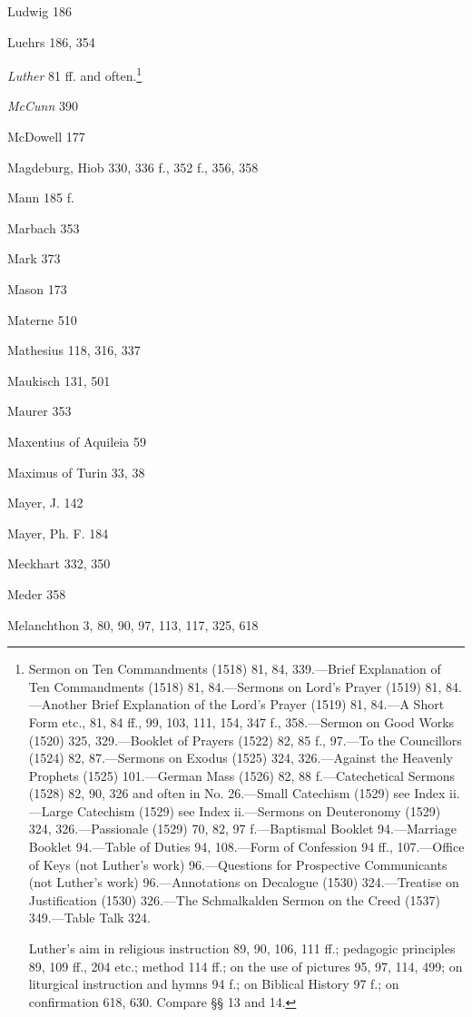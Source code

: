 Ludwig 186

Luehrs 186, 354

\emph{Luther} 81 ff. and often.\footnote{Sermon on Ten Commandments (1518) 81, 84, 339.—Brief Explanation of Ten Commandments (1518) 81, 84.—Sermons on Lord’s Prayer (1519) 81, 84.—Another Brief Explanation of the Lord’s Prayer (1519) 81, 84.—A Short Form
etc., 81, 84 ff., 99, 103, 111, 154, 347 f., 358.—Sermon on Good Works (1520) 325, 329.—Booklet of Prayers (1522) 82, 85 f., 97.—To the Councillors (1524) 82, 87.—Sermons on Exodus (1525) 324, 326.—Against the Heavenly Prophets (1525) 101.—German Mass (1526) 82, 88 f.—Catechetical Sermons (1528) 82, 90, 326 and often in No. 26.—Small Catechism (1529) see Index ii.—Large Catechism (1529) see Index ii.—Sermons on Deuteronomy (1529) 324, 326.—Passionale (1529) 70, 82, 97 f.—Baptismal Booklet 94.—Marriage Booklet 94.—Table of Duties 94, 108.—Form of Confession 94 ff., 107.—Office of Keys (not Luther’s work) 96.—Questions for Prospective Communicants (not Luther’s work) 96.—Annotations on Decalogue (1530) 324.—Treatise on Justification (1530) 326.—The Schmalkalden Sermon on the Creed (1537) 349.—Table Talk 324.

Luther’s aim in religious instruction 89, 90, 106, 111 ff.; pedagogic principles 89, 109 ff., 204 etc.; method 114 ff.; on the use of pictures 95, 97, 114, 499; on liturgical instruction and hymns 94 f.; on Biblical History 97 f.; on confirmation 618, 630. Compare §§ 13 and 14.}

\emph{McCunn} 390

McDowell 177

Magdeburg, Hiob 330, 336 f., 352 f., 356, 358

Mann 185 f.

Marbach 353

Mark 373

Mason 173

Materne 510

Mathesius 118, 316, 337

Maukisch 131, 501

Maurer 353

Maxentius of Aquileia 59

Maximus of Turin 33, 38

Mayer, J. 142

Mayer, Ph. F. 184

Meckhart 332, 350

Meder 358

Melanchthon 3, 80, 90, 97, 113, 117, 325, 618

